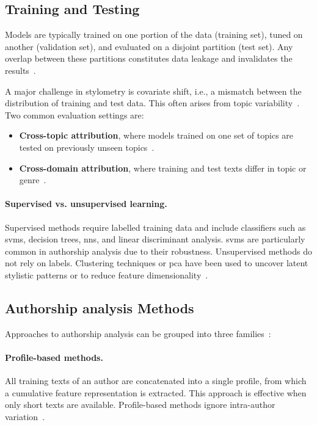 \subsection{Training and Testing}

Models are typically trained on one portion of the data (training set), tuned on another (validation set), and evaluated on a disjoint partition (test set). 
Any overlap between these partitions constitutes data leakage and invalidates the results~\citep{bischoff_importance_2020,altakrori_topic_2021,boenninghoff_o2d2_2021}. 

A major challenge in stylometry is covariate shift, i.e., a mismatch between the distribution of training and test data. 
This often arises from topic variability~\citep{boenninghoff_o2d2_2021}. 
Two common evaluation settings are:
\begin{itemize}
    \item \textbf{Cross-topic attribution}, where models trained on one set of topics are tested on previously unseen topics~\citep{altakrori_topic_2021}.  
    \item \textbf{Cross-domain attribution}, where training and test texts differ in topic or genre~\citep{barlas_cross_domain_2020}.  
\end{itemize}

\paragraph{Supervised vs. unsupervised learning.}  
Supervised methods require labelled training data and include classifiers such as \acp{svm}, decision trees, \acp{nn}, and linear discriminant analysis. 
\acp{svm} are particularly common in authorship analysis due to their robustness. 
Unsupervised methods do not rely on labels.
Clustering techniques or \ac{pca} have been used to uncover latent stylistic patterns or to reduce feature dimensionality~\citep{abbasi_writeprints_2008}.


\subsection{Authorship analysis Methods}
\label{subsec:attribution_methods}

Approaches to authorship analysis can be grouped into three families~\citep{stamatatos_survey_2009}:

\paragraph{Profile-based methods.} 
All training texts of an author are concatenated into a single profile, from which a cumulative feature representation is extracted. 
This approach is effective when only short texts are available.
Profile-based methods ignore intra-author variation~\citep{stamatatos_survey_2009,elmanarelbouanani_authorship_2014,neal_surveying_2018}.  


